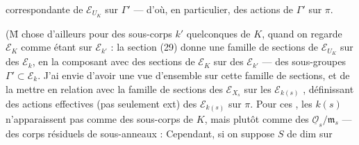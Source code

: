 correspondante de $\mathcal E_{U_K}$ sur $\Gamma'$ --- d'où, en particulier, des actions de $\Gamma'$ sur $\pi$.

(\={M} chose d'ailleurs pour des sous-corps $k'$ quelconques de $K$, quand on regarde $\mathcal E_K$ comme étant sur $\mathcal E_{k'}$ : la section (29) donne une famille de sections de $\mathcal E_{U_K}$ sur des $\mathcal E_k$,  en la composant avec des sections de $\mathcal E_K$ sur des $\mathcal E_{k'}$ --- des sous-groupes $\Gamma'\subset\mathcal E_k$. J'ai envie d'avoir une vue d'ensemble sur cette famille de sections, et de la mettre en relation avec la famille de sections des $\mathcal E_{X_s}$ sur les $\mathcal E_{k(s)}$ , définissant des actions effectives (pas seulement ext) des $\mathcal E_{k(s)}$ sur $\pi$. Pour ces , les $k(s)$ n'apparaissent pas comme des sous-corps de $K$, mais plutôt comme des $\underline{\mathcal O}_s/\mathfrak m_s$ --- des corps résiduels de sous-anneaux : Cependant, si on suppose $S$ de dim   sur
